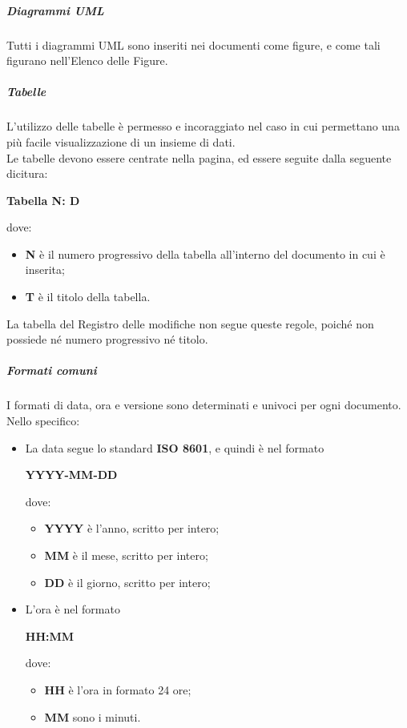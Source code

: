 \documentclass[../norme-di-progetto.tex]{subfiles}
\begin{document}
\subparagraph{Diagrammi UML}
Tutti i diagrammi UML sono inseriti nei documenti come figure, e come tali figurano nell'Elenco delle Figure.

\subparagraph{Tabelle}
L'utilizzo delle tabelle è permesso e incoraggiato nel caso in cui permettano una più facile visualizzazione di un insieme di dati. \\
Le tabelle devono essere centrate nella pagina, ed essere seguite dalla seguente dicitura: \\ \begin{center}
  \centering
  \textbf{Tabella N: D}
\end{center} dove:
\begin{itemize}
  \item \textbf{N} è il numero progressivo della tabella all'interno del documento in cui è inserita;
  \item \textbf{T} è il titolo della tabella.
\end{itemize}
La tabella del Registro delle modifiche non segue queste regole, poiché non possiede né numero progressivo né titolo.

\subparagraph{Formati comuni}
I formati di data, ora e versione sono determinati e univoci per ogni documento. Nello specifico:
\begin{itemize}
  \item La data segue lo standard \textbf{ISO 8601}, e quindi è nel formato \\ \begin{center}
    \centering
    \textbf{YYYY-MM-DD}
  \end{center} dove:
  \begin{itemize}
    \item \textbf{YYYY} è l'anno, scritto per intero;
    \item \textbf{MM} è il mese, scritto per intero;
    \item \textbf{DD} è il giorno, scritto per intero;
  \end{itemize}
  \item L'ora è nel formato \\ \begin{center}
  \centering
  \textbf{HH:MM}
  \end{center} dove:
  \begin{itemize}
    \item \textbf{HH} è l'ora in formato 24 ore;
    \item \textbf{MM} sono i minuti.
  \end{itemize}
\end{itemize}
\end{document}
